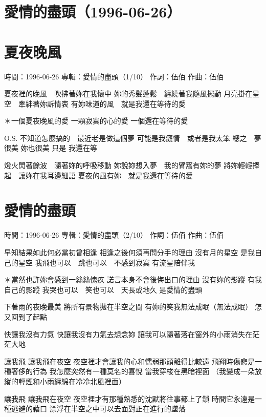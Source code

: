 \documentclass[UTF8,a4paper,oneside,twocolumn,12pt]{ctexbook}
\newcommand{\infopair}[2]{\textbullet #1：#2}
\newcommand{\zc}[1][伍佰]{\infopair{作詞}{#1}}
\newcommand{\zq}[1][伍佰]{\infopair{作曲}{#1}}
\newcommand{\zj}[1]{\infopair{專輯}{#1}}
\newcommand{\sj}[1]{\infopair{時間}{#1}}
\newenvironment{info}{\begin{flushleft}\kaishu
	}
	{\end{flushleft}\normalsize\yahei\par}
\newenvironment{lyric}{
	}
{}
\begin{document}
\section*{愛情的盡頭（1996-06-26）}
\section{夏夜晚風}
\begin{info}
	\sj{1996-06-26}
	\zj{愛情的盡頭（1/10）}
	\zc
	\zq
\end{info}
\begin{lyric}
	夏夜裡的晚風　吹拂著妳在我懷中
	妳的秀髮蓬鬆　纏繞著我隨風擺動
	月亮掛在星空　牽絆著妳訴情衷
	有妳味道的風　就是我還在等待的愛

	＊一個夏夜晚風的愛
	一顆寂寞的心的愛
	一個還在等待的愛

	O.S. 不知道怎麼搞的　最近老是做這個夢
	可能是我癡情　或者是我太笨
	總之　夢很美
	妳也很美
	只是
	我還在等

	燈火閃著餘波　隨著妳的呼吸移動
	妳說妳想入夢　我的臂窩有妳的夢
	將妳輕輕捧起　讓妳在我耳邊細語
	夏夜的風有妳　就是我還在等待的愛
\end{lyric}

\section{愛情的盡頭}
\begin{info}
	\sj{1996-06-26}
	\zj{愛情的盡頭（2/10）}
	\zc
	\zq
\end{info}
\begin{lyric}
	早知結果如此何必當初曾相逢
	相逢之後何須再問分手的理由
	沒有月的星空
	是我自己的星空
	我飛也可以　跳也可以　不感到寂寞
	有流星陪伴我

	＊當然也許妳會感到一絲絲愧疚
	諾言本身不會後悔出口的理由
	沒有妳的影蹤
	有我自己的影蹤
	我哭也可以　笑也可以　天長或地久
	是愛情的盡頭

	下著雨的夜晚最美
	將所有景物拋在半空之間
	有妳的笑我無法成眠（無法成眠）
	怎又回到了起點

	快讓我沒有力氣
	快讓我沒有力氣去想念妳
	讓我可以隨著落在窗外的小雨消失在茫茫大地

	讓我飛
	讓我飛在夜空
	夜空裡才會讓我的心和懦弱那頭離得比較遠
	飛翔時傷悲是一種奢侈的行為
	我怎麼突然有一種莫名的喜悅 當我穿梭在黑暗裡面
	（我變成一朵放縱的輕煙和小雨纏綿在冷冷北風裡面）

	讓我飛
	讓我飛在夜空
	夜空裡才有那種熟悉的沈默將往事都上了鎖
	時間它永遠是一種逃避的藉口
	漂浮在半空之中可以去面對正在進行的墜落
\end{lyric}
\end{document}
